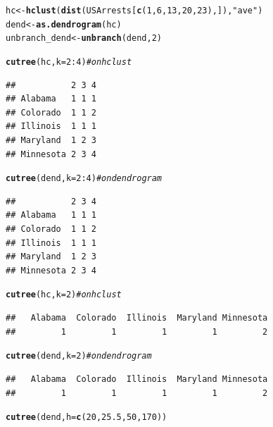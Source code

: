 \documentclass[shortnames,nojss,article]{jss}\usepackage[]{graphicx}\usepackage[]{color}
\makeatletter
\newcommand{\hlnum}[1]{\textcolor[rgb]{0.686,0.059,0.569}{#1}}%
\newcommand{\hlstr}[1]{\textcolor[rgb]{0.192,0.494,0.8}{#1}}%
\newcommand{\hlcom}[1]{\textcolor[rgb]{0.678,0.584,0.686}{\textit{#1}}}%
\newcommand{\hlopt}[1]{\textcolor[rgb]{0,0,0}{#1}}%
\newcommand{\hlstd}[1]{\textcolor[rgb]{0.345,0.345,0.345}{#1}}%
\newcommand{\hlkwb}[1]{\textcolor[rgb]{0.69,0.353,0.396}{#1}}%
\newcommand{\hlkwc}[1]{\textcolor[rgb]{0.333,0.667,0.333}{#1}}%
\newcommand{\hlkwd}[1]{\textcolor[rgb]{0.737,0.353,0.396}{\textbf{#1}}}%
\newenvironment{kframe}{%
 \def\at@end@of@kframe{}%
 \ifinner\ifhmode%
  \def\at@end@of@kframe{\end{minipage}}%
  \begin{minipage}{\columnwidth}%
 \fi\fi%
 \def\FrameCommand##1{\hskip\@totalleftmargin \hskip-\fboxsep
 \colorbox{shadecolor}{##1}\hskip-\fboxsep
     \hskip-\linewidth \hskip-\@totalleftmargin \hskip\columnwidth}%
 \MakeFramed {\advance\hsize-\width
   \@totalleftmargin\z@ \linewidth\hsize
   \@setminipage}}%
 {\par\unskip\endMakeFramed%
 \at@end@of@kframe}
\newenvironment{knitrout}{}{} %
\makeatother
\begin{document}
\begin{knitrout}
\color{fgcolor}\begin{kframe}
\begin{alltt}
\hlstd{hc} \hlkwb{<-} \hlkwd{hclust}\hlstd{(}\hlkwd{dist}\hlstd{(USArrests[}\hlkwd{c}\hlstd{(}\hlnum{1}\hlstd{,} \hlnum{6}\hlstd{,} \hlnum{13}\hlstd{,} \hlnum{20}\hlstd{,} \hlnum{23}\hlstd{), ]),} \hlstr{"ave"}\hlstd{)}
\hlstd{dend} \hlkwb{<-} \hlkwd{as.dendrogram}\hlstd{(hc)}
\hlstd{unbranch_dend} \hlkwb{<-} \hlkwd{unbranch}\hlstd{(dend,} \hlnum{2}\hlstd{)}

\hlkwd{cutree}\hlstd{(hc,} \hlkwc{k} \hlstd{=} \hlnum{2}\hlopt{:}\hlnum{4}\hlstd{)}  \hlcom{# on hclust}
\end{alltt}
\begin{verbatim}
##           2 3 4
## Alabama   1 1 1
## Colorado  1 1 2
## Illinois  1 1 1
## Maryland  1 2 3
## Minnesota 2 3 4
\end{verbatim}
\begin{alltt}
\hlkwd{cutree}\hlstd{(dend,} \hlkwc{k} \hlstd{=} \hlnum{2}\hlopt{:}\hlnum{4}\hlstd{)}  \hlcom{# on dendrogram}
\end{alltt}
\begin{verbatim}
##           2 3 4
## Alabama   1 1 1
## Colorado  1 1 2
## Illinois  1 1 1
## Maryland  1 2 3
## Minnesota 2 3 4
\end{verbatim}
\begin{alltt}
\hlkwd{cutree}\hlstd{(hc,} \hlkwc{k} \hlstd{=} \hlnum{2}\hlstd{)}  \hlcom{# on hclust}
\end{alltt}
\begin{verbatim}
##   Alabama  Colorado  Illinois  Maryland Minnesota 
##         1         1         1         1         2
\end{verbatim}
\begin{alltt}
\hlkwd{cutree}\hlstd{(dend,} \hlkwc{k} \hlstd{=} \hlnum{2}\hlstd{)}  \hlcom{# on dendrogram}
\end{alltt}
\begin{verbatim}
##   Alabama  Colorado  Illinois  Maryland Minnesota 
##         1         1         1         1         2
\end{verbatim}
\begin{alltt}
\hlkwd{cutree}\hlstd{(dend,} \hlkwc{h} \hlstd{=} \hlkwd{c}\hlstd{(}\hlnum{20}\hlstd{,} \hlnum{25.5}\hlstd{,} \hlnum{50}\hlstd{,} \hlnum{170}\hlstd{))}
\end{alltt}
\begin{verbatim}

\end{verbatim}
\end{kframe}
\end{knitrout}
\end{document}
